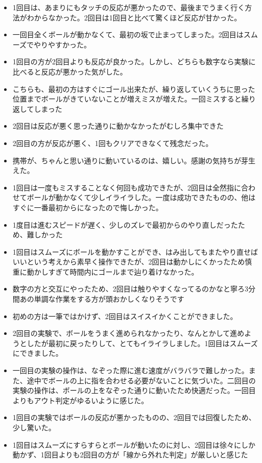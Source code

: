 \begin{itemize}
  \item 1回目は、あまりにもタッチの反応が悪かったので、最後までうまく行く方法がわからなかった。2回目は1回目と比べて驚くほど反応が甘かった。
  \item 一回目全くボールが動かなくて、最初の坂で止まってしまった。2回目はスムーズでやりやすかった。
  \item 1回目の方が2回目よりも反応が良かった。しかし、どちらも数字なら実験に比べると反応が悪かった気がした。
  \item こちらも、最初の方はすぐにゴール出来たが、繰り返していくうちに思った位置までボールがきていないことが増えミスが増えた。一回ミスすると繰り返してしまった
  \item 2回目は反応が悪く思った通りに動かなかったがむしろ集中できた
  \item 2回目の方が反応が悪く、1回もクリアできなくて残念だった。
  \item 携帯が、ちゃんと思い通りに動いているのは、嬉しい。感謝の気持ちが芽生えた。
  \item 1回目は一度もミスすることなく何回も成功できたが、2回目は全然指に合わせてボールが動かなくて少しイライラした。一度は成功できたものの、他はすぐに一番最初からになったので悔しかった。
  \item 1度目は進むスピードが遅く、少しのズレで最初からのやり直しだったため、難しかった
  \item 1回目はスムーズにボールを動かすことができ、はみ出してもまたやり直せばいいという考えから素早く操作できたが、2回目は動かしにくかったため慎重に動かしすぎて時間内にゴールまで辿り着けなかった。
  \item 数字の方と交互にやったため、2回目は触りやすくなってるのかなと寧ろ3分間あの単調な作業をする方が頭おかしくなりそうです
  \item 初めの方は一筆ではかけず、2回目はスイスイかくことができました。
  \item 2回目の実験で、ボールをうまく進められなかったり、なんとかして進めようとしたが最初に戻ったりして、とてもイライラしました。1回目はスムーズにできました。
  \item 一回目の実験の操作は、なぞった際に進む速度がバラバラで難しかった。また、途中でボールの上に指を合わせる必要がないことに気づいた。二回目の実験の操作は、ボールの上をなぞった通りに動いたため快適だった。一回目よりもアウト判定がゆるいように感じた。
  \item 1回目の実験ではボールの反応が悪かったものの、2回目では回復したため、少し驚いた。
  \item 1回目はスムーズにすらすらとボールが動いたのに対し、2回目は徐々にしか動かず、1回目よりも2回目の方が「線から外れた判定」が厳しいと感じた

\end{itemize}
